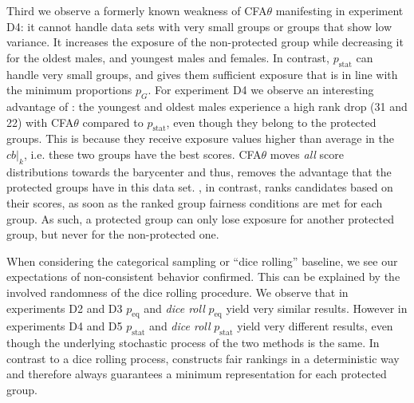 Third we observe a formerly known weakness of CFA$\theta$ manifesting in experiment D4: it cannot handle data sets with very small groups or groups that show low variance.
%
It increases the exposure of the non-protected group while decreasing it for the oldest males, and youngest males and females.
%
In contrast, \algoFAIR $p_{\text{stat}}$ can handle very small groups, and gives them sufficient exposure that is in line with the minimum proportions $p_G$.
%
For experiment D4 we observe an interesting advantage of \algoFAIR: the youngest and oldest males experience a high rank drop (31 and 22) with CFA$\theta$ compared to \algoFAIR $p_{\text{stat}}$, even though they belong to the protected groups.
%
This is because they receive exposure values higher than average in the $cb|_k$, i.e. these two groups have the best scores.
%
CFA$\theta$ moves \emph{all} score distributions towards the barycenter and thus, removes the advantage that the protected groups have in this data set.
%
\algoFAIR, in contrast, ranks candidates based on their scores, as soon as the ranked group fairness conditions are met for each group.
%
As such, a protected group can only lose exposure for another protected group, but never for the non-protected one.

When considering the categorical sampling or ``dice rolling'' baseline, we see our expectations of non-consistent behavior confirmed.
%
This can be explained by the involved randomness of the dice rolling procedure.
%
We observe that in experiments D2 and D3 \algoFAIR $p_\text{eq}$ and \emph{dice roll} $p_\text{eq}$ yield very similar results.
%
However in experiments D4 and D5 \algoFAIR $p_\text{stat}$ and \emph{dice roll} $p_\text{stat}$ yield very different results, even though the underlying stochastic process of the two methods is the same.
%
In contrast to a dice rolling process, \algoFAIR constructs fair rankings in a deterministic way and therefore always guarantees a minimum representation for each protected group. 

